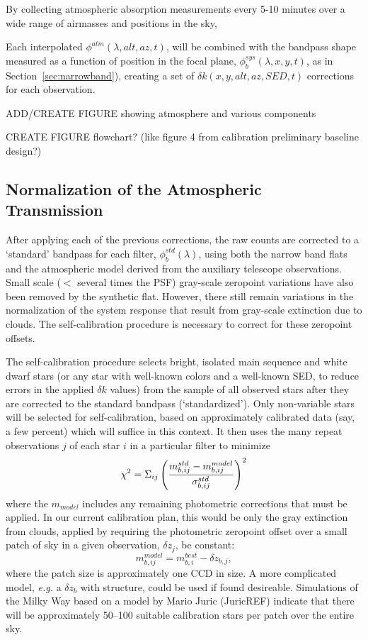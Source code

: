 \documentclass[12pt,preprint]{aastex}
\begin{document}
By collecting atmospheric absorption measurements every 5-10 minutes 
over a wide range of airmasses and positions in the sky, 

Each interpolated $\phi^{atm}(\lambda,alt,az,t)$, will be combined with
the bandpass shape measured as a function of position in the focal
plane, $\phi_b^{sys}(\lambda,x,y,t)$, as in
Section~\ref{sec:narrowband}), creating a set of $\delta
k(x,y,alt,az,SED,t)$ corrections for each observation.

ADD/CREATE FIGURE showing atmosphere and various components

CREATE FIGURE flowchart? (like figure 4 from calibration preliminary
baseline design?)


\subsection{Normalization of the Atmospheric Transmission}
\label{sec:selfcalib}

After applying each of the previous corrections, the raw counts are
corrected to a `standard' bandpass for each filter,
$\phi_b^{std}(\lambda)$, using both the narrow band flats and the
atmospheric model derived from the auxiliary telescope
observations. Small scale ($<$ several times the PSF) gray-scale
zeropoint variations have also been removed by the synthetic
flat. However, there still remain variations in the normalization of the
system response that result from gray-scale extinction due to
clouds. The self-calibration procedure is necessary to correct for
these zeropoint offsets.

The self-calibration procedure selects bright, isolated main sequence
and white dwarf stars (or any star with well-known colors and a
well-known SED, to reduce errors in the applied
$\delta k$ values) from the sample of all observed stars after they are
corrected to the standard bandpass (`standardized'). Only non-variable stars will be
selected for self-calibration, based on approximately calibrated data
(say, a few percent) which will suffice in this context. It then uses
the many repeat observations $j$ of each star $i$ in a particular filter to minimize
\begin{equation}
\label{eqn:selfcalmin}
\chi^2 = \Sigma_{ij} \left(  { m_{b,ij}^{std} - m_{b,ij}^{model} \over
    \sigma_{b,ij}^{std} } \right)^2
\end{equation}
where the $m_{model}$ includes any remaining photometric corrections
that must be applied. In our current calibration plan, this would be only the
gray extinction from clouds, applied by requiring the photometric
zeropoint offset over a small patch of sky in a given observation, $\delta z_j$, be constant:
\begin{equation}
\label{eqn:zp}
m^{model}_{b,ij} = m^{best}_{b,i} - \delta z_{b,j},
\end{equation}
where the patch size is approximately one CCD in size. A more
complicated model, {\it e.g.} a $\delta z_{b}$ with structure, could
be used if found desireable. Simulations of the Milky Way based on a
model by Mario Juric (JuricREF) indicate that there will be
approximately 50--100 
suitable calibration stars per patch over the entire sky. 
\end{document}
